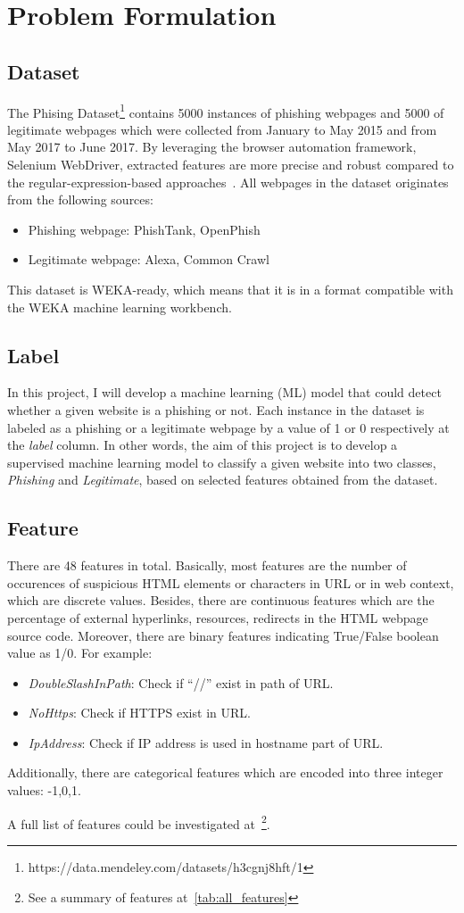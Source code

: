 \section{Problem Formulation}

\subsection{Dataset}
The Phising Dataset\footnote{https://data.mendeley.com/datasets/h3cgnj8hft/1}
contains 5000 instances of phishing webpages and 5000 of legitimate webpages which
were collected from January to May 2015 and from May 2017 to June 2017. By leveraging
the browser automation framework, Selenium WebDriver, extracted features are more
precise and robust compared to the regular-expression-based approaches~\cite{CHIEW2019153}.
All webpages in the dataset originates from the following sources:
\begin{itemize}
    \item Phishing webpage: PhishTank, OpenPhish
    \item Legitimate webpage: Alexa, Common Crawl
\end{itemize}

This dataset is WEKA-ready, which means that it is in a format compatible with the
WEKA machine learning workbench.

\subsection{Label}
In this project, I will develop a machine learning (ML) model that could detect whether a given
website is a phishing or not. Each instance in the dataset is labeled as a phishing
or a legitimate webpage by a value of 1 or 0 respectively at the \emph{label} column.
In other words, the aim of this project is to develop a supervised machine learning model
to classify a given website into two classes, \emph{Phishing} and \emph{Legitimate}, based
on selected features obtained from the dataset.

\subsection{Feature}
There are 48 features in total. Basically, most features are the number of occurences of suspicious
HTML elements or characters in URL or in web context, which are discrete values. Besides, there are
continuous features which are the percentage of external hyperlinks, resources, redirects in the
HTML webpage source code. Moreover, there are binary features indicating True/False boolean
value as 1/0. For example:
\begin{itemize}
    \item \emph{DoubleSlashInPath}: Check if ``//'' exist in path of URL.
    \item \emph{NoHttps}: Check if HTTPS exist in URL.
    \item \emph{IpAddress}: Check if IP address is used in hostname part of URL.
\end{itemize}

Additionally, there are categorical features which are encoded into three integer values: -1,0,1.

A full list of features could be investigated at~\cite{CHIEW2019153}\footnote{See a summary of features
at~\autoref{tab:all_features}}.
